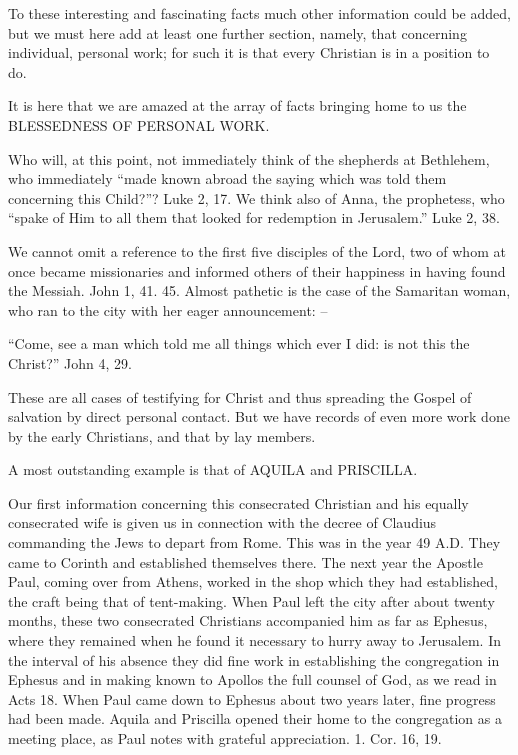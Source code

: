 \documentclass[
]{book}
\begin{document}
To these interesting and fascinating facts much other information could be added, but we must here add at least one further section, namely, that concerning individual, personal work; for such it is that every Christian is in a position to do.

It is here that we are amazed at the array of facts bringing home to us the BLESSEDNESS OF PERSONAL WORK.

Who will, at this point, not immediately think of the shepherds at Bethlehem, who immediately ``made known abroad the saying which was told them concerning this Child?''? Luke 2, 17. We think also of Anna, the prophetess, who ``spake of Him to all them that looked for redemption in Jerusalem.'' Luke 2, 38.

We cannot omit a reference to the first five disciples of the Lord, two of whom at once became missionaries and informed others of their happiness in having found the Messiah. John 1, 41. 45. Almost pathetic is the case of the Samaritan woman, who ran to the city with her eager announcement: --

``Come, see a man which told me all things which ever I did: is not this the Christ?'' John 4, 29.

These are all cases of testifying for Christ and thus spreading the Gospel of salvation by direct personal contact. But we have records of even more work done by the early Christians, and that by lay members.

A most outstanding example is that of AQUILA and PRISCILLA.

Our first information concerning this consecrated Christian and his equally consecrated wife is given us in connection with the decree of Claudius commanding the Jews to depart from Rome. This was in the year 49 A.D. They came to Corinth and established themselves there. The next year the Apostle Paul, coming over from Athens, worked in the shop which they had established, the craft being that of tent-making. When Paul left the city after about twenty months, these two consecrated Christians accompanied him as far as Ephesus, where they remained when he found it necessary to hurry away to Jerusalem. In the interval of his absence they did fine work in establishing the congregation in Ephesus and in making known to Apollos the full counsel of God, as we read in Acts 18. When Paul came down to Ephesus about two years later, fine progress had been made. Aquila and Priscilla opened their home to the congregation as a meeting place, as Paul notes with grateful appreciation. 1. Cor. 16, 19.
\end{document}
